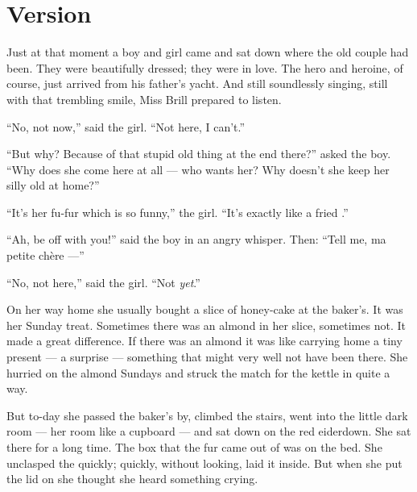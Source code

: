 \documentclass{fiche}
\begin{document}
\newpage
\section{Version}

\begin{version}
Just at that moment a boy and girl came and sat down where the old couple had been. They were
beautifully dressed; they were in love. The hero and heroine, of course, just arrived from his
father's yacht. And still soundlessly singing, still with that trembling smile, Miss Brill
prepared to listen.

``No, not now,'' said the girl. ``Not here, I can't.''

``But why? Because of that stupid old thing at the end there?'' asked the boy. ``Why does she
come here at all --- who wants her? Why doesn't she keep her silly old
 at home?''

``It's her fu-fur which is so funny,''  the girl. ``It's
exactly like a fried .''

``Ah, be off with you!'' said the boy in an angry whisper. Then: ``Tell me, ma petite
chère ---''

``No, not here,'' said the girl. ``Not \emph{yet}.''

On her way home she usually bought a slice of honey-cake at the baker's. It was her Sunday
treat. Sometimes there was an almond in her slice, sometimes not. It made a great difference.
If there was an almond it was like carrying home a tiny present --- a surprise --- something
that might very well not have been there. She hurried on the almond Sundays and struck the
match for the kettle in quite a  way.

But to-day she passed the baker's by, climbed the stairs, went into the little dark room ---
her room like a cupboard --- and sat down on the red eiderdown. She sat there for a long time.
The box that the fur came out of was on the bed. She unclasped the
 quickly; quickly, without looking, laid it inside. But
when she put the lid on she thought she heard something crying.
\end{version}
\end{document}
